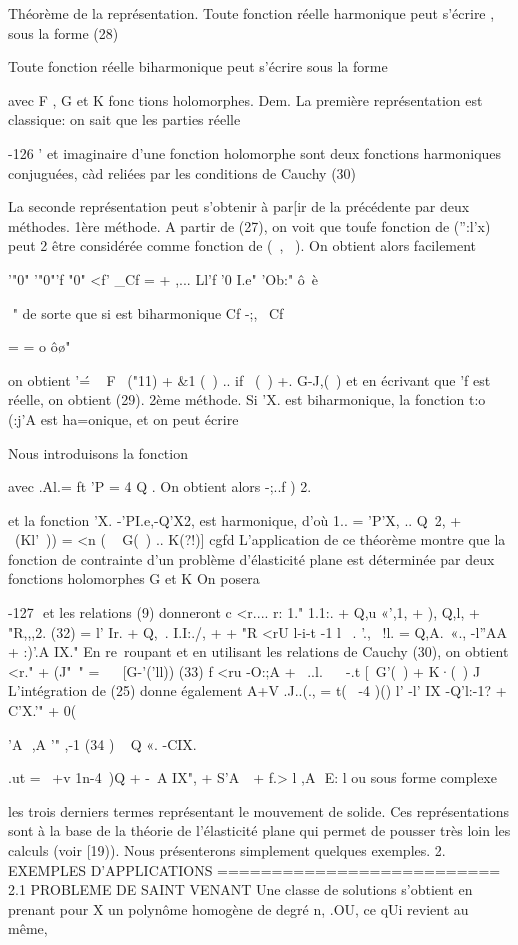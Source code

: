 {{{Théorème de la représentation. Toute fonction réelle harmonique peut s'écrire 
, 
sous la forme 
(28) 


Toute fonction réelle biharmonique peut s'écrire sous la forme 

avec F , G et K fonc tions holomorphes. 
Dem. La première représentation est classique: on sait que les parties réelle 

-126 '­
et imaginaire d'une fonction holomorphe sont deux fonctions harmoniques con­juguées, càd reliées par les conditions de Cauchy 
(30) 

La seconde représentation peut s'obtenir à par[ir de la précédente par deux 
méthodes. 
1ère méthode. A partir de (27), on voit que toufe fonction de ('':l'x) peut
2
être considérée comme fonction de (~,~ ). On obtient alors facilement 

'"0" '"0"'f "0" <f'
_Cf
= + ,...
Ll'f '0 I.e" 'Ob:" ô~è~

 
" 
de sorte que si est biharmonique
Cf 
-;,~ Cf 


= = o 
ô\o"} 
on obtient 
'\' = ~ F~ ("11) + &1 (~) .. if ~(~) +. G-J,(~) 
et en écrivant que 'f est réelle, on obtient (29). 
2ème méthode. Si 'X. est biharmonique, la fonction t:o (:j'A est ha=onique, et on peut écrire 

Nous introduisons la fonction 

avec .Al.= ft 'P = 4 Q . On obtient alors 
-\-;..f ) 2.­

et la fonction 'X. -'PI.e,-Q'X2, est harmonique, d'où 1.. = 'P'X, .. Q~2, + ~(Kl'~)) = <n ( ~ G(~) .. K(?!)] cgfd L'application de ce théorème montre que la fonction de contrainte d'un problème d'élasticité plane est déterminée par deux fonctions holomor­phes G et K On posera 

-127 ­
et les relations (9) donneront 
c
<r.... r: 1." 1.1:. + Q,u «',1, + ), Q,l, + "R,,,2. 
(32) = l' Ir. + Q,~. I.I:./, + + "R
<rU l-i-t -1 l ~. '., ~!l. = Q,A.\ «., -l''AA + :)'.A
IX." 
En re~roupant et en utilisant les relations de Cauchy (30), on obtient 
<r." + (J"~" = ~ ~[G-'('ll))
(33) 
f <ru -O:;A + ~..l. ~~ -.t [~G'(~) + K·(~) J 
L'intégration de (25) donne également 
A+V 
.J..(., = t(~ -4 )() l' -l' IX -Q'l:-1? + C'X.'" + 0( }
'A  ,A '" ,-1
(34 ) ~ 
Q «. -CIX.
{ .ut = ~+v 1n-4~)Q + -~A IX", + S'A   + f.> l
,A 
E: l ou sous forme complexe 

les trois derniers termes représentant le mouvement de solide. Ces représen­tations sont à la base de la théorie de l'élasticité plane qui permet de pous­ser très loin les calculs (voir [19)). Nous présenterons simplement quelques exemples. 
2. EXEMPLES D'APPLICATIONS
========================== 
2.1 PROBLEME DE SAINT VENANT 
Une classe de solutions s'obtient en prenant pour X un polynôme homogène de degré n, .OU, ce qUi revient au même, 

}}
